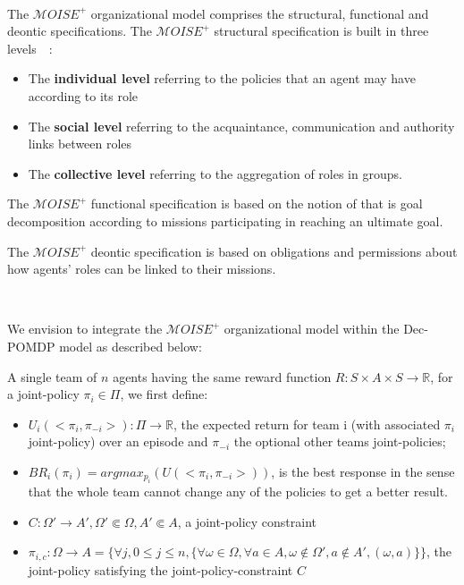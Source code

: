 \documentclass[runningheads]{llncs}
\begin{document}
\

The $\mathcal{M}OISE^{+}$ organizational model comprises the structural, functional and deontic specifications.
The $\mathcal{M}OISE^{+}$ structural specification is built in three levels~~\cite{Hubner2007}:
\begin{itemize}
    \item The \textbf{individual level} referring to the policies that an agent may have according to its role
    \item The \textbf{social level} referring to the acquaintance, communication and authority links between roles
    \item The \textbf{collective level} referring to the aggregation of roles in groups.
\end{itemize}

The $\mathcal{M}OISE^{+}$ functional specification is based on the notion of  that is goal decomposition according to missions participating in reaching an ultimate goal.

The $\mathcal{M}OISE^{+}$ deontic specification is based on obligations and permissions about how agents' roles can be linked to their missions.

\ 

We envision to integrate the $\mathcal{M}OISE^{+}$ organizational model within the Dec-POMDP model as described below:

A single team of $n$ agents having the same reward function $R: S \times A \times S \rightarrow \mathbb{R}$, for a joint-policy $\pi_i \in \Pi$, we first define:

\begin{itemize}
    \item $U_i(<\pi_i, \pi_{-i}>): \Pi \rightarrow \mathbb{R}$, the expected return for team i (with associated $\pi_i$ joint-policy) over an episode and $\pi_{-i}$ the optional other teams joint-policies;
    \item $BR_{i}(\pi_i) = argmax_{p_i}(U(<\pi_i,\pi_{-i}>))$, is the best response in the sense that the whole team cannot change any of the policies to get a better result.
    \item $C: \Omega' \rightarrow A', \Omega' \Subset \Omega, A' \Subset A$, a joint-policy constraint
    \item $\pi_{i,c}: \Omega \rightarrow A = \{\forall j, 0 \le j \le n, \{\forall \omega \in \Omega, \forall a \in A, \omega \notin \Omega', a \notin A', (\omega, a)\}\}$, the joint-policy satisfying the joint-policy-constraint $C$
\end{itemize}
\end{document}
